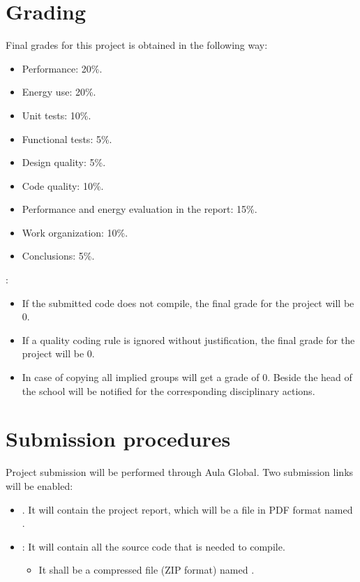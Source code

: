 \section{Grading}

Final grades for this project is obtained in the following way:


\begin{itemize}
  \item Performance: 20\%.
  \item Energy use: 20\%.
  \item Unit tests: 10\%.
  \item Functional tests: 5\%.
  \item Design quality: 5\%.
  \item Code quality: 10\%.
  \item Performance and energy evaluation in the report: 15\%.
  \item Work organization: 10\%.
  \item Conclusions: 5\%.  
\end{itemize}

:

\begin{itemize}
  \item If the submitted code does not compile, 
        the final grade for the project will be 0.

  \item If a quality coding rule is ignored without justification,
        the final grade for the project will be 0.
        
  \item In case of copying all implied groups will get a grade of 0.
        Beside the head of the school will be notified for
        the corresponding disciplinary actions.
\end{itemize}

\section{Submission procedures}

Project submission will be performed through Aula Global.
Two submission links will be enabled:

\begin{itemize}

\item {}. 
      It will contain the project report,
      which will be a file in PDF format named .

\item {}: 
      It will contain all the source code that is needed to compile.
\begin{itemize}
  \item It shall be a compressed file (ZIP format) named
        .
\end{itemize}

\end{itemize}

